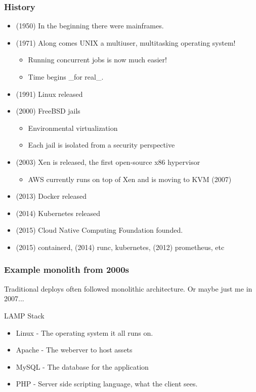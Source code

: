 \documentclass[11pt]{beamer}
\begin{document}
\begin{frame}
  \frametitle{History}
  \begin{itemize}

  \item (1950) In the beginning there were mainframes.
  \item (1971) Along comes UNIX a multiuser, multitasking operating system!
  \begin{itemize}
    \item Running concurrent jobs is now much easier!
    \item Time begins _for real_.
  \end{itemize}
  \item (1991) Linux released
  \item (2000) FreeBSD jails
  \begin{itemize}
    \item Environmental virtualization
    \item Each jail is isolated from a security perspective
  \end{itemize}
  \item (2003) Xen is released, the first open-source x86 hypervisor
  \begin{itemize}
    \item AWS currently runs on top of Xen and is moving to KVM (2007)
  \end{itemize}
  \item (2013) Docker released\*
  \item (2014) Kubernetes released\*
  \item (2015) Cloud Native Computing Foundation founded.
  \item (2015) containerd, (2014) runc, kubernetes, (2012) prometheus, etc
  \end{itemize}
\end{frame}

\begin{frame}
  \frametitle{Example monolith from 2000s}
  Traditional deploys often followed monolithic architecture. Or maybe just me in 2007...

  LAMP Stack
  \begin{itemize}
    \item Linux - The operating system it all runs on.
    \item Apache - The weberver to host assets
    \item MySQL - The database for the application
    \item PHP - Server side scripting language, what the client sees.
  \end{itemize}
\end{frame}
\end{document}
